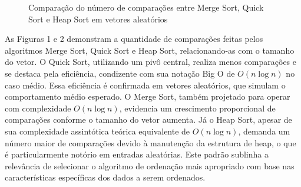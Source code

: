 \documentclass[conference]{IEEEtran}
\begin{document}
\begin{figure}[H]
    \centering
    \caption{Comparação do número de comparações entre Merge Sort, Quick Sort e Heap Sort em vetores aleatórios}
    \label{fig:randomVectorComparisonGraph}
\end{figure}

As Figuras 1 e 2 demonstram a quantidade de comparações feitas pelos algoritmos Merge Sort, Quick Sort e Heap Sort, relacionando-as com o tamanho do vetor. O Quick Sort, utilizando um pivô central, realiza menos comparações e se destaca pela eficiência, condizente com sua notação Big O de \( O(n \log n) \) no caso médio. Essa eficiência é confirmada em vetores aleatórios, que simulam o comportamento médio esperado. O Merge Sort, também projetado para operar com complexidade \( O(n \log n) \), evidencia um crescimento proporcional de comparações conforme o tamanho do vetor aumenta. Já o Heap Sort, apesar de sua complexidade assintótica teórica equivalente de \( O(n \log n) \), demanda um número maior de comparações devido à manutenção da estrutura de heap, o que é particularmente notório em entradas aleatórias. Este padrão sublinha a relevância de selecionar o algoritmo de ordenação mais apropriado com base nas características específicas dos dados a serem ordenados.
\end{document}
